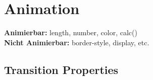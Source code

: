 
\section{Animation}

\textbf{Animierbar:} length, number, color, calc()\\
\textbf{Nicht Animierbar:} border-style, display, etc.

\subsection{Transition Properties}



